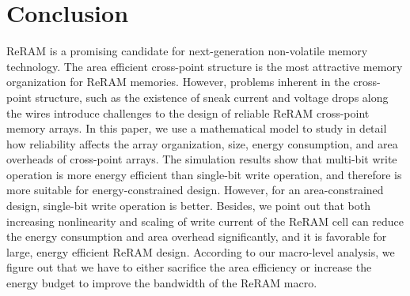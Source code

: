 
\section{Conclusion}\label{sec:conclusion}
\vspace{10pt} ReRAM is a promising candidate for next-generation
non-volatile memory technology. The area efficient cross-point structure
is the most attractive memory organization for ReRAM memories. However,
problems inherent in the cross-point structure, such as the existence of
sneak current and voltage drops along the wires introduce challenges to
the design of reliable ReRAM cross-point memory arrays. In this paper, we
use a mathematical model to study in detail how reliability affects the
array organization, size, energy consumption, and area overheads of
cross-point arrays. The simulation results show that multi-bit write
operation is more energy efficient than single-bit write operation, and
therefore is more suitable for energy-constrained design. However, for an
area-constrained design, single-bit write operation is better. Besides, we
point out that both increasing nonlinearity and scaling of write current
of the ReRAM cell can reduce the energy consumption and area overhead
significantly, and it is favorable for large, energy efficient ReRAM
design. According to our macro-level analysis, we figure out that we have
to either sacrifice the area efficiency or increase the energy budget to
improve the bandwidth of the ReRAM macro.
